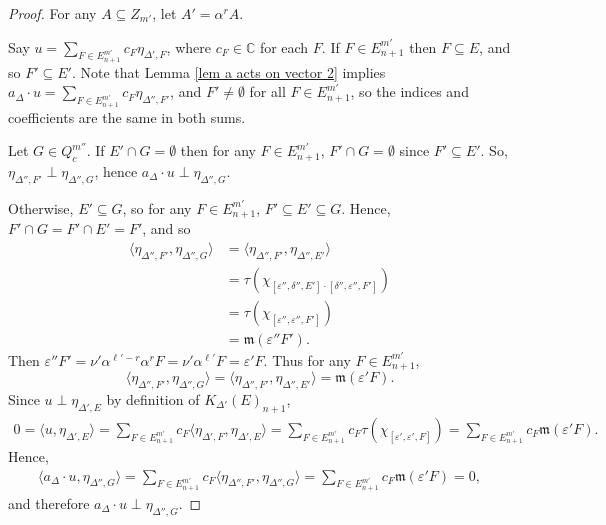 \documentclass[12pt]{amsart}
\newcommand{\sse}{\subseteq}
\newcommand{\mf}[1]{\mathfrak{#1}}
\newcommand{\emp}{\emptyset}
\newcommand{\C}{\mathbb{C}}
\newcommand{\al}{\alpha}
\newcommand{\de}{\delta}
\newcommand{\De}{\Delta}
\newcommand{\ep}{\varepsilon}
\theoremstyle{plain} %
\theoremstyle{definition} %
\begin{document}
\begin{proof}
    For any $A \sse Z_{m'}$, let $A' = \al^r A$. 

    Say $u = \sum_{F \in E_{n+1}^{m'}} c_F \eta_{\De', F}$, where $c_F \in \C$ for each $F$. If $F \in E_{n+1}^{m'}$ then $F \sse E$, and so $F'\sse E'$. Note that Lemma \ref{lem a acts on vector 2} implies $a_{\De} \cdot u = \sum_{F \in E_{n+1}^{m'}} c_F \eta_{\De'', F'}$, and  $F' \neq \emp$ for all $F \in E_{n+1}^{m'}$, so the indices and coefficients are the same in both sums.
    
    Let $G \in Q_c^{m''}$. If $E' \cap G = \emp$ then for any $F \in E_{n+1}^{m'}$, $F' \cap G = \emp$ since $F' \sse E'$. So, $\eta_{\De'', F'} \perp \eta_{\De'', G}$, hence $a_{\De} \cdot u \perp \eta_{\De'', G}$.

    Otherwise, $E' \sse G$, so for any $F \in E_{n+1}^{m'}$, $F' \sse E' \sse G$. Hence, $F' \cap G = F' \cap E' = F'$, and so 
    \begin{align*}
        \langle \eta_{\De'', F'}, \eta_{\De'', G} \rangle &= \langle \eta_{\De'', F'}, \eta_{\De'', E'}\rangle\\
        &= \tau(\chi_{[\ep'', \de'', E']\cdot[\de'', \ep'', F']})\\
        &= \tau(\chi_{[\ep'', \ep'', F']})\\
        &= \mf{m}(\ep'' F').
    \end{align*}
    Then $\ep'' F' = \nu' \al^{\ell'-r} \al^r F = \nu' \al^{\ell'} F = \ep'F$. Thus for any $F \in E_{n+1}^{m'}$, \[\langle \eta_{\De'', F'}, \eta_{\De'', G}\rangle = \langle \eta_{\De'', F'}, \eta_{\De'', E'} \rangle = \mf{m}(\ep'F).\]
    Since $u \perp \eta_{\De', E}$ by definition of $K_{\De'}(E)_{n+1}$,
    \begin{align*}
        0 = \langle u, \eta_{\De',E}\rangle = \sum_{F \in E_{n+1}^{m'}} c_F \langle \eta_{\De', F}, \eta_{\De', E}\rangle = \sum_{F \in E_{n+1}^{m'}} c_F \tau(\chi_{[\ep', \ep', F]}) = \sum_{F \in E_{n+1}^{m'}} c_F \mf{m}(\ep'F).
    \end{align*}
    Hence,
    \begin{align*}
        \langle a_{\De} \cdot u, \eta_{\De'', G}\rangle = \sum_{F \in E_{n+1}^{m'}} c_F \langle\eta_{\De'', F'}, \eta_{\De'', G} \rangle = \sum_{F \in E_{n+1}^{m'}} c_F \mf{m}(\ep'F) = 0,
    \end{align*}
    and therefore $a_{\De} \cdot u \perp \eta_{\De'', G}$.
\end{proof}
\end{document}
